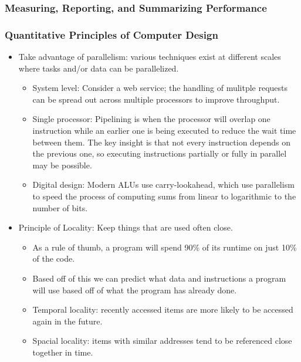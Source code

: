 \subsubsection{Measuring, Reporting, and Summarizing Performance}
\subsubsection{Quantitative Principles of Computer Design}
\begin{itemize}
    \item Take advantage of parallelism: various techniques exist at different scales where tasks and/or data can be parallelized.
    \begin{itemize}
        \item System level: Consider a web service; the handling of mulitple requests can be spread out across multiple processors to improve throughput. 
        \item Single processor: Pipelining is when the processor will overlap one instruction while an earlier one is being executed to reduce the wait time between them. The key insight is that not every instruction depends on the previous one, so executing instructions partially or fully in parallel may be possible.
        \item Digital design: Modern ALUs use carry-lookahead, which use parallelism to speed the process of computing sums from linear to logarithmic to the number of bits.
    \end{itemize}
    \item Principle of Locality: Keep things that are used often close.
    \begin{itemize}
        \item As a rule of thumb, a program will spend 90\% of its runtime on just 10\% of the code.
        \item Based off of this we can predict what data and instructions a program will use based off of what the program has already done.
        \item Temporal locality: recently accessed items are more likely to be accessed again in the future.
        \item Spacial locality: items with similar addresses tend to be referenced close together in time.
    \end{itemize}
\end{itemize}
